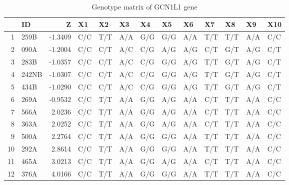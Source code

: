 \documentclass{article}
\begin{document}
\begin{table}[tbp]
\centering
\caption{Genotype matrix of GCN1L1 gene} 
\label{tab:gcn1l1}
{\small
\begin{tabular}{rlrllllllllll}
  \hline
 & ID & Z & X1 & X2 & X3 & X4 & X5 & X6 & X7 & X8 & X9 & X10 \\ 
  \hline
1 & 259B & -1.3409 & C/C & T/T & A/A & G/G & G/G & A/A & T/T & T/T & A/A & C/C \\ 
  2 & 090A & -1.2004 & C/C & C/T & A/C & C/G & A/G & A/G & C/T & G/T & A/G & C/T \\ 
  3 & 283B & -1.0357 & C/C & C/T & A/C & C/G & G/G & A/G & T/T & G/T & A/G & C/T \\ 
  4 & 242NB & -1.0307 & C/C & C/T & A/C & C/G & G/G & A/G & T/T & G/T & A/G & C/T \\ 
  5 & 434B & -1.0290 & C/C & C/T & A/C & C/G & G/G & A/G & T/T & G/T & A/G & C/T \\ 
  6 & 269A & -0.9532 & C/C & T/T & A/A & G/G & A/G & A/A & C/T & T/T & A/A & C/C \\ 
  7 & 566A & 2.0236 & C/C & T/T & A/A & G/G & A/G & A/A & C/T & T/T & A/A & C/C \\ 
  8 & 363A & 2.0252 & C/C & T/T & A/A & G/G & A/G & A/A & C/T & T/T & A/A & C/C \\ 
  9 & 500A & 2.2764 & C/C & T/T & A/A & G/G & G/G & A/A & T/T & T/T & A/A & C/C \\ 
  10 & 292A & 2.8614 & C/C & T/T & A/A & G/G & G/G & A/A & T/T & T/T & A/A & C/C \\ 
  11 & 465A & 3.0213 & C/C & T/T & A/A & G/G & A/G & A/A & C/T & T/T & A/A & C/C \\ 
  12 & 376A & 4.0166 & C/C & T/T & A/A & G/G & G/G & A/A & T/T & T/T & A/A & C/C \\ 
   \hline
\end{tabular}
}
\end{table}
\end{document}
